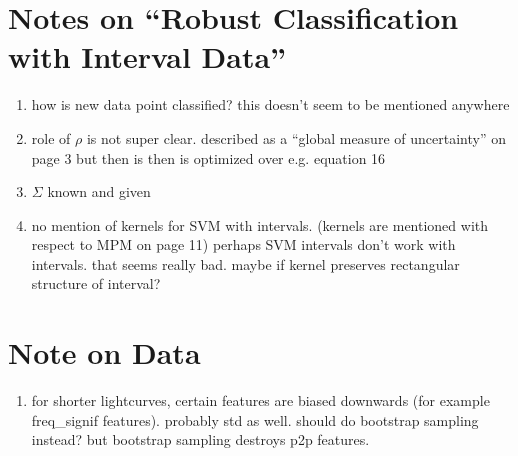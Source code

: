 \documentclass[11pt]{article}
\begin{document}
\section{Notes on ``Robust Classification with Interval Data''}
\begin{enumerate}
\item how is new data point classified? this doesn't seem to be mentioned anywhere
\item role of $\rho$ is not super clear. described as a ``global measure of uncertainty'' on page 3 but then is then is optimized over e.g. equation 16
\item $\Sigma$ known and given
\item no mention of kernels for SVM with intervals. (kernels are mentioned with respect to MPM on page 11) perhaps SVM intervals don't work with intervals. that seems really bad. maybe if kernel preserves rectangular structure of interval?
\end{enumerate}
\section{Note on Data}
\begin{enumerate}
\item for shorter lightcurves, certain features are biased downwards (for example freq\_signif features). probably std as well. should do bootstrap sampling instead? but bootstrap sampling destroys p2p features.
\end{enumerate}
\end{document}

